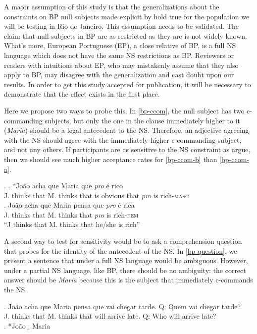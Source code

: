 \documentclass[12pt,letterpaper]{article}
\begin{document}
A major assumption of this study is that the generalizations about the constraints on BP null subjects made explicit by \citeauthor{holmberg09} hold true for the population we will be testing in Rio de Janeiro. This assumption needs to be validated. The claim that null subjects in BP are as restricted as they are is not widely known. What's more, European Portuguese (EP), a close relative of BP, is a full NS language which does not have the same NS restrictions as BP. Reviewers or readers with intuitions about EP, who may mistakenly assume that they also apply to BP, may disagree with the generalization and cast doubt upon our results. In order to get this study accepted for publication, it will be necessary to demonstrate that the effect exists in the first place.

Here we propose two ways to probe this. In \ref{bp-ccom}, the null subject has two c-commanding subjects, but only the one in the clause immediately higher to it (\emph{Maria}) should be a legal antecedent to the NS. Therefore, an adjective agreeing with the NS should agree with the immediately-higher c-commanding subject, and not any others. If participants are as sensitive to the NS constraint as \citeauthor{holmberg09} argue, then we should see much higher acceptance rates for \ref{bp-ccom-b} than \ref{bp-ccom-a}.

\ex. \label{bp-ccom} \ag. *João acha que Maria que \emph{pro} é rico \label{bp-ccom-a} \\
          J. thinks that M. thinks that is obvious that \emph{pro} is rich-\textsc{masc}\\
     \bg. João acha que Maria pensa que \emph{pro} é rica\\
          J. thinks that M. thinks that \emph{pro} is rich-\textsc{fem} \label{bp-ccom-b}\\
          ``J thinks that M. thinks that he/she is rich''


A second way to test for sensitivity would be to ask a comprehension question that probes for the identity of the antecedent of the NS. In \ref{bp-question}, we present a sentence that under a full NS language would be ambiguous. However, under a partial NS language, like BP, there should be no ambiguity: the correct answer should be \emph{Maria} because this is the subject that immediately c-commands the NS. 
  
  \exg. \label{bp-question} João acha que Maria pensa que vai chegar tarde. Q: Quem vai chegar tarde?\\
        {} J. thinks that M. thinks that will arrive late. Q: Who will arrive late?\\
        \a. *João
        \b. Maria
\end{document}
